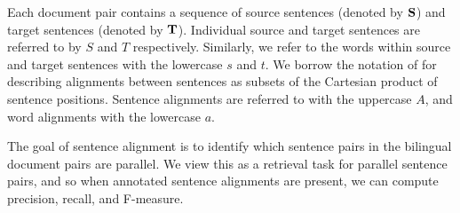 Each document pair contains a sequence of source sentences (denoted by ${\bf
S}$) and target sentences (denoted by ${\bf T}$). Individual source and target
sentences are referred to by $S$ and $T$ respectively. Similarly, we refer to
the words within source and target sentences with the lowercase $s$ and $t$. We
borrow the notation of \citep{Och03} for describing alignments between sentences
as subsets of the Cartesian product of sentence positions. Sentence alignments
are referred to with the uppercase $A$, and word alignments with the lowercase
$a$.

The goal of sentence alignment is to identify which sentence pairs in the
bilingual document pairs are parallel. We view this as a retrieval task for
parallel sentence pairs, and so when annotated sentence alignments are present,
we can compute precision, recall, and F-measure.
